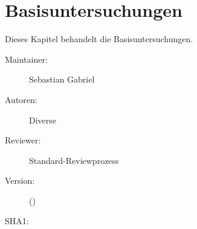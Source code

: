 % 
\def\ChapterCode{BAU}
\chapter
[\CO{[BAU]} Basisuntersuchungen]
{Basisuntersuchungen}
\label{chp:BAU}

\ChapterIntro
{%
\noindent Dieses Kapitel behandelt die Basisuntersuchungen.
}
{%
\begin{description}
  \item[Maintainer:] Sebastian Gabriel
  \item[Autoren:] Diverse
  \item[Reviewer:] Standard-Reviewprozess
  \item[Version:] {\VarDocVersionTypeName} ({\VarDocVersionTypeDescription})
  \item[SHA1:] {\DocGitCommit}
\end{description}

{\TxTeilkapitelAASS}
}






\clearpage %
% 
% 
% 
% 
% 
% 





\section{}
\label{topic:vitalwerte}

